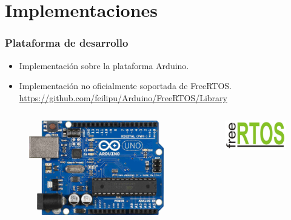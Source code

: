 \section{Implementaciones}

\begin{frame}
\frametitle{Plataforma de desarrollo}
\begin{block}{}
	\begin{itemize}
		\item Implementación sobre la plataforma Arduino.
		\item Implementación no oficialmente soportada de FreeRTOS. \href{https://github.com/feilipu/Arduino/FreeRTOS/Library}{https://github.com/feilipu/Arduino/FreeRTOS/Library}
	\end{itemize}

\begin{columns}[T]
	\begin{column}{.50\textwidth}
	\begin{figure}[htbp]
		\centering
		\includegraphics[width=1\textwidth]{diagramas/implementacion1.jpg}
	\end{figure}
	\end{column}
	\hfill
	\begin{column}{.50\textwidth}
		
		\begin{figure}[htbp]
			\centering
			\includegraphics[width=1\textwidth]{diagramas/implementacion2.jpg}
		\end{figure}
		

\end{column}
\end{columns}
\end{block}
\end{frame}
